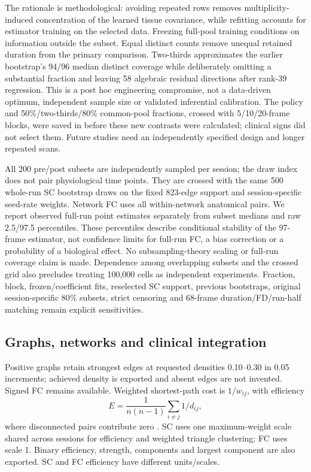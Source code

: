 \documentclass[11pt,a4paper]{article}
\begin{document}
The rationale is methodological: avoiding repeated rows removes multiplicity-induced concentration of the learned tissue covariance, while refitting accounts for estimator training on the selected data. Freezing full-pool training conditions on information outside the subset. Equal distinct counts remove unequal retained duration from the primary comparison. Two-thirds approximates the earlier bootstrap's 94/96 median distinct coverage while deliberately omitting a substantial fraction and leaving 58 algebraic residual directions after rank-39 regression. This is a post hoc engineering compromise, not a data-driven optimum, independent sample size or validated inferential calibration. The policy and 50\%/two-thirds/80\% common-pool fractions, crossed with 5/10/20-frame blocks, were saved in  before these new contrasts were calculated; clinical signs did not select them. Future studies need an independently specified design and longer repeated scans.

All 200 pre/post subsets are independently sampled per session; the draw index does not pair physiological time points. They are crossed with the same 500 whole-run SC bootstrap draws on the fixed 823-edge support and session-specific seed-rate weights. Network FC uses all within-network anatomical pairs. We report observed full-run point estimates separately from subset medians and raw 2.5/97.5 percentiles. These percentiles describe conditional stability of the 97-frame estimator, not confidence limits for full-run FC, a bias correction or a probability of a biological effect. No subsampling-theory scaling or full-run coverage claim is made. Dependence among overlapping subsets and the crossed grid also precludes treating 100,000 cells as independent experiments. Fraction, block, frozen/coefficient fits, reselected SC support, previous bootstraps, original session-specific 80\% subsets, strict censoring and 68-frame duration/FD/run-half matching remain explicit sensitivities.

\subsection{Graphs, networks and clinical integration}
Positive graphs retain strongest edges at requested densities 0.10--0.30 in 0.05 increments; achieved density is exported and absent edges are not invented. Signed FC remains available. Weighted shortest-path cost is $1/w_{ij}$, with efficiency
\begin{equation}E=\frac{1}{n(n-1)}\sum_{i\ne j}1/d_{ij},\end{equation}
where disconnected pairs contribute zero \citep{rubinov2010}. SC uses one maximum-weight scale shared across sessions for efficiency and weighted triangle clustering; FC uses scale 1. Binary efficiency, strength, components and largest component are also exported. SC and FC efficiency have different units/scales.
\end{document}

